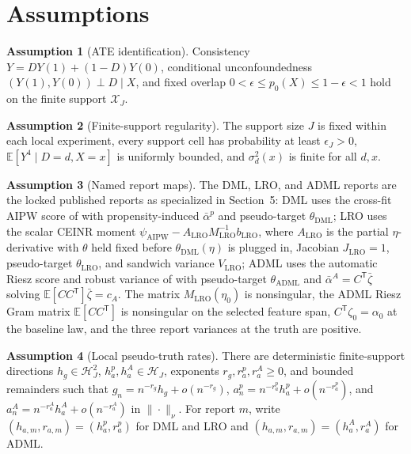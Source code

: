 \documentclass[11pt]{article}
\newcommand{\E}{\mathbb{E}}
\newcommand{\transpose}{\mathsf{T}}
\theoremstyle{definition}
\newtheorem{assumption}{Assumption}
\theoremstyle{plain}
\theoremstyle{remark}
\begin{document}
\section{Assumptions}
\begin{assumption}[ATE identification]\label{ass:ate-id}
Consistency \(Y=DY(1)+(1-D)Y(0)\), conditional unconfoundedness \((Y(1),Y(0))\perp D\mid X\), and fixed overlap \(0<\epsilon\le p_0(X)\le 1-\epsilon<1\) hold on the finite support \(\mathcal X_J\).
\end{assumption}

\begin{assumption}[Finite-support regularity]\label{ass:finite-regular}
The support size \(J\) is fixed within each local experiment, every support cell has probability at least \(\epsilon_J>0\), \(\E[Y^4\mid D=d,X=x]\) is uniformly bounded, and \(\sigma_d^2(x)\) is finite for all \(d,x\).
\end{assumption}

\begin{assumption}[Named report maps]\label{ass:report-maps}
The DML, LRO, and ADML reports are the locked published reports as specialized in Section~5: DML uses the cross-fit AIPW score of \cite{ChernozhukovEtAl2018ECTJ} with propensity-induced \(\bar\alpha^p\) and pseudo-target \(\theta_{\mathrm{DML}}\); LRO uses the scalar CEINR moment \(\psi_{\mathrm{AIPW}}-A_{\mathrm{LRO}}M_{\mathrm{LRO}}^{-1}b_{\mathrm{LRO}}\), where \(A_{\mathrm{LRO}}\) is the partial \(\eta\)-derivative with \(\theta\) held fixed before \(\theta_{\mathrm{DML}}(\eta)\) is plugged in, Jacobian \(J_{\mathrm{LRO}}=1\), pseudo-target \(\theta_{\mathrm{LRO}}\), and sandwich variance \(V_{\mathrm{LRO}}\); ADML uses the automatic Riesz score and robust variance of \cite{ChernozhukovNeweySingh2022ADML} with pseudo-target \(\theta_{\mathrm{ADML}}\) and \(\bar\alpha^A=C^\transpose\bar\zeta\) solving \(\E[CC^\transpose]\bar\zeta=c_A\).  The matrix \(M_{\mathrm{LRO}}(\eta_0)\) is nonsingular, the ADML Riesz Gram matrix \(\E[CC^\transpose]\) is nonsingular on the selected feature span, \(C^\transpose\zeta_0=\alpha_0\) at the baseline law, and the three report variances at the truth are positive.
\end{assumption}

\begin{assumption}[Local pseudo-truth rates]\label{ass:pseudotruth-rates}
There are deterministic finite-support directions \(h_g\in\mathcal H_J^2\), \(h^p_a,h^A_a\in\mathcal H_J\), exponents \(r_g,r^p_a,r^A_a\ge0\), and bounded remainders such that \(g_n=n^{-r_g}h_g+o(n^{-r_g})\), \(a^p_n=n^{-r^p_a}h^p_a+o(n^{-r^p_a})\), and \(a^A_n=n^{-r^A_a}h^A_a+o(n^{-r^A_a})\) in \(\|\cdot\|_\nu\).  For report \(m\), write \((h_{a,m},r_{a,m})=(h^p_a,r^p_a)\) for DML and LRO and \((h_{a,m},r_{a,m})=(h^A_a,r^A_a)\) for ADML.
\end{assumption}
\end{document}
